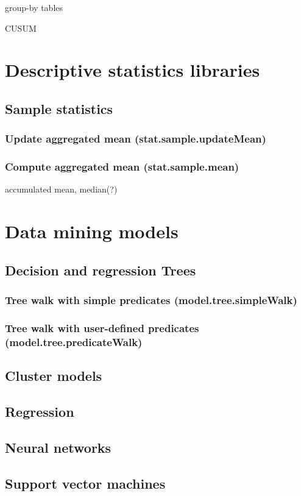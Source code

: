 \documentclass{article}
\theoremstyle{definition}
\begin{document}
group-by tables

CUSUM

\pagebreak

\section{Descriptive statistics libraries}

\subsection{Sample statistics}

\subsubsection{Update aggregated mean (stat.sample.updateMean)}

\subsubsection{Compute aggregated mean (stat.sample.mean)}

accumulated mean, median(?)

\pagebreak

\section{Data mining models}

\subsection{Decision and regression Trees}

\subsubsection{Tree walk with simple predicates (model.tree.simpleWalk)}

\subsubsection{Tree walk with user-defined predicates (model.tree.predicateWalk)}

\subsection{Cluster models}

\subsection{Regression}

\subsection{Neural networks}

\subsection{Support vector machines}
\end{document}
